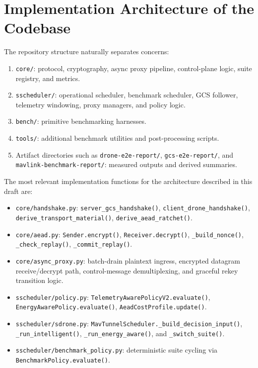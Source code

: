 \documentclass[conference]{IEEEtran}
\begin{document}
\section{Implementation Architecture of the Codebase}
The repository structure naturally separates concerns:
\begin{enumerate}[leftmargin=*]
\item \texttt{core/}: protocol, cryptography, async proxy pipeline, control-plane logic, suite registry, and metrics.
\item \texttt{sscheduler/}: operational scheduler, benchmark scheduler, GCS follower, telemetry windowing, proxy managers, and policy logic.
\item \texttt{bench/}: primitive benchmarking harnesses.
\item \texttt{tools/}: additional benchmark utilities and post-processing scripts.
\item Artifact directories such as \texttt{drone-e2e-report/}, \texttt{gcs-e2e-report/}, and \texttt{mavlink-benchmark-report/}: measured outputs and derived summaries.
\end{enumerate}

The most relevant implementation functions for the architecture described in this draft are:
\begin{itemize}[leftmargin=*]
\item \texttt{core/handshake.py}: \texttt{server\_gcs\_handshake()}, \texttt{client\_drone\_handshake()}, \texttt{derive\_transport\_material()}, \texttt{derive\_aead\_ratchet()}.
\item \texttt{core/aead.py}: \texttt{Sender.encrypt()}, \texttt{Receiver.decrypt()}, \texttt{\_build\_nonce()}, \texttt{\_check\_replay()}, \texttt{\_commit\_replay()}.
\item \texttt{core/async\_proxy.py}: batch-drain plaintext ingress, encrypted datagram receive/decrypt path, control-message demultiplexing, and graceful rekey transition logic.
\item \texttt{sscheduler/policy.py}: \texttt{TelemetryAwarePolicyV2.evaluate()}, \texttt{EnergyAwarePolicy.evaluate()}, \texttt{AeadCostProfile.update()}.
\item \texttt{sscheduler/sdrone.py}: \texttt{MavTunnelScheduler.\_build\_decision\_input()}, \texttt{\_run\_intelligent()}, \texttt{\_run\_energy\_aware()}, and \texttt{\_switch\_suite()}.
\item \texttt{sscheduler/benchmark\_policy.py}: deterministic suite cycling via \texttt{BenchmarkPolicy.evaluate()}.
\end{itemize}
\end{document}
